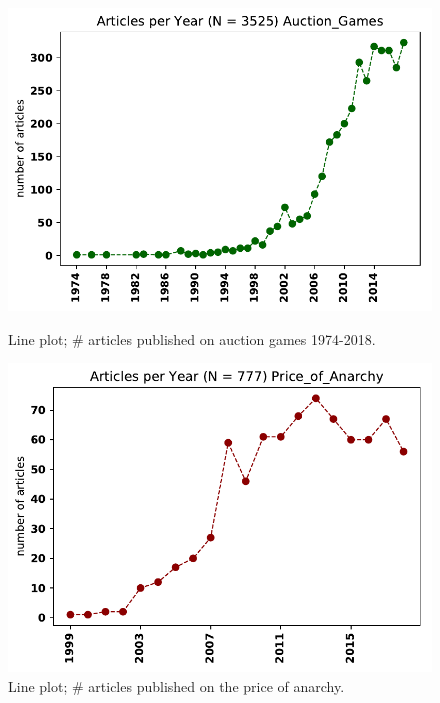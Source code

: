\documentclass{article}
\theoremstyle{definition}
\begin{document}
\begin{figure}[!hbtp]
    \begin{minipage}{.45\textwidth}
        \centering
        \includegraphics[width=\textwidth]{./assets/images/Auction_Games.pdf}
        \caption{Line plot; \# articles published on auction games 1974-2018.}\label{fig:timeseries_ag}
    \end{minipage}%
    \begin{minipage}{.45\textwidth}
        \centering
        \includegraphics[width=\textwidth]{./assets/images/Price_of_Anarchy.pdf}
        \caption{Line plot; \# articles published on the price of anarchy.}\label{fig:timeseries_pa}
    \end{minipage}
    \end{figure}
\end{document}
